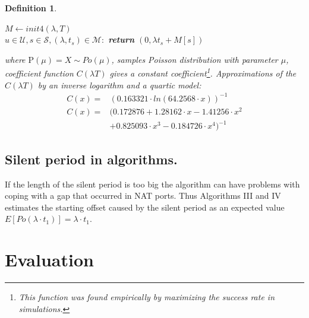 \documentclass[twoside]{article}
\newtheorem{mydef}{Definition}
\begin{document}
\begin{multicols}{2}
\begin{mydef}
\begin{algorithmic}[1]
   \State $M\gets init4(\lambda,T)$\\
   \State $u \in \mathcal{U}, s \in \mathcal{S}, (\lambda, t_s) \in \mathcal{M}:$
    \State \textbf{return} $(0, \lambda t_s + M[s])$
   \EndFunction
\end{algorithmic}
where $\text{P}(\mu) = X \sim Po(\mu)$, samples Poisson distribution with
parameter $\mu$, coefficient function $C(\lambda T)$ gives a constant 
coefficient\footnote{This function was found empirically by maximizing the success rate in simulations.}.
Approximations of the $C(\lambda T)$ by an inverse logarithm and a quartic model:
\begin{align*}
C(x) = & ({0.163321 \cdot  ln(64.2568 \cdot x)})^{-1}\\
C(x) = & (0.172876+1.28162\cdot x-1.41256\cdot x^2 \\
       & +0.825093\cdot x^3-0.184726\cdot x^4)^{-1}
\end{align*}
\end{mydef}
% 
\subsection{Silent period in algorithms.} If the length of the silent period is too big
the algorithm can have problems with coping with a gap that occurred in NAT ports. Thus 
Algorithms III and IV estimates the starting offset caused by the silent period as an
expected value $E[Po(\lambda \cdot t_1)] = \lambda\cdot t_1$.

\section{Evaluation}


\end{multicols}
\end{document}
